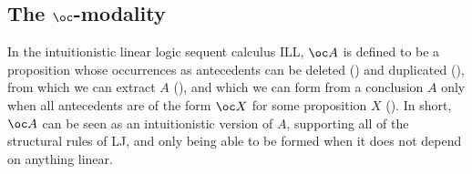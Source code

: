 
\subsection{The $\oc$-modality}


In the intuitionistic linear logic sequent calculus ILL, $\oc A$ is defined
to be a proposition whose occurrences as antecedents can be deleted
() and duplicated (), from which we can
extract $A$ (), and which we can form from a conclusion
$A$ only when all antecedents are of the form $\oc X$ for some proposition $X$
().
In short, $\oc A$ can be seen as an intuitionistic version of $A$, supporting
all of the structural rules of LJ, and only being able to be formed when it
does not depend on anything linear.

